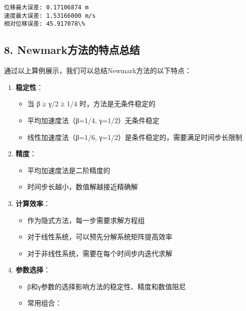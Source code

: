 \documentclass[11pt]{article}
\providecommand{\tightlist}{%
      \setlength{\itemsep}{0pt}\setlength{\parskip}{0pt}}
\begin{document}
    \begin{Verbatim}[commandchars=\\\{\}]
位移最大误差: 0.17106874 m
速度最大误差: 1.53166000 m/s
相对位移误差: 45.917078\%
    \end{Verbatim}

    \subsection{8.
Newmark方法的特点总结}\label{newmarkux65b9ux6cd5ux7684ux7279ux70b9ux603bux7ed3}

通过以上算例展示，我们可以总结Newmark方法的以下特点：

\begin{enumerate}
\def\labelenumi{\arabic{enumi}.}
\tightlist
\item
  \textbf{稳定性}：

  \begin{itemize}
  \tightlist
  \item
    当 β ≥ γ/2 ≥ 1/4 时，方法是无条件稳定的
  \item
    平均加速度法（β=1/4, γ=1/2）无条件稳定
  \item
    线性加速度法（β=1/6, γ=1/2）是条件稳定的，需要满足时间步长限制
  \end{itemize}
\item
  \textbf{精度}：

  \begin{itemize}
  \tightlist
  \item
    平均加速度法是二阶精度的
  \item
    时间步长越小，数值解越接近精确解
  \end{itemize}
\item
  \textbf{计算效率}：

  \begin{itemize}
  \tightlist
  \item
    作为隐式方法，每一步需要求解方程组
  \item
    对于线性系统，可以预先分解系统矩阵提高效率
  \item
    对于非线性系统，需要在每个时间步内迭代求解
  \end{itemize}
\item
  \textbf{参数选择}：

  \begin{itemize}
  \tightlist
  \item
    β和γ参数的选择影响方法的稳定性、精度和数值阻尼
  \item
    常用组合：


\end{itemize}
\end{enumerate}
\end{document}

